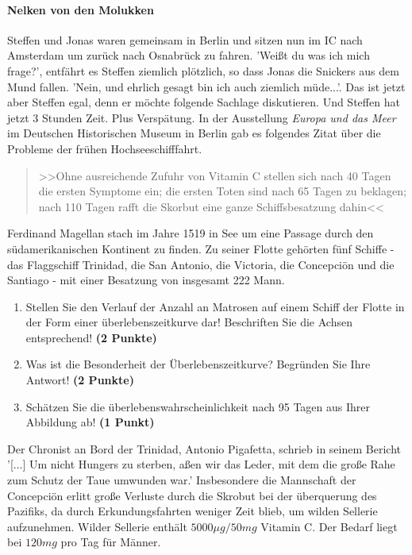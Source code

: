 \documentclass[a4paper, 9pt]{scrartcl}\usepackage[]{graphicx}\usepackage[]{xcolor}
\begin{document}
\paragraph{Nelken von den Molukken}



Steffen und Jonas waren gemeinsam in Berlin und sitzen nun im IC nach Amsterdam um zurück nach Osnabrück zu fahren. 'Weißt du was ich mich frage?', entfährt es Steffen ziemlich plötzlich, so dass Jonas die Snickers aus dem Mund fallen. 'Nein, und ehrlich gesagt bin ich auch ziemlich müde...'. Das ist jetzt aber Steffen egal, denn er möchte folgende Sachlage diskutieren. Und Steffen hat jetzt 3 Stunden Zeit. Plus Verspätung. In der Ausstellung \textit{Europa und das Meer} im Deutschen Historischen Museum in Berlin gab es folgendes Zitat über die Probleme der frühen Hochseeschifffahrt.

\begin{quote}
  >>Ohne ausreichende Zufuhr von Vitamin C stellen sich nach 40 Tagen die ersten Symptome ein; die ersten Toten sind nach 65 Tagen zu beklagen; nach 110 Tagen rafft die Skorbut eine ganze Schiffsbesatzung dahin<<
\end{quote}

Ferdinand Magellan stach im Jahre 1519 in See um eine Passage durch den südamerikanischen Kontinent zu finden. Zu seiner Flotte gehörten fünf Schiffe - das Flaggschiff Trinidad, die San Antonio, die Victoria, die Concepciön und die Santiago - mit einer Besatzung von insgesamt 222 Mann. 

\begin{enumerate}
\item Stellen Sie den Verlauf der Anzahl an Matrosen auf einem Schiff der Flotte in der Form einer überlebenszeitkurve dar! Beschriften Sie die Achsen entsprechend! \textbf{(2 Punkte)} 
\item Was ist die Besonderheit der Überlebenszeitkurve? Begründen Sie Ihre Antwort! \textbf{(2 Punkte)} 
\item Schätzen Sie die überlebenswahrscheinlichkeit nach 95 Tagen aus Ihrer Abbildung ab! \textbf{(1 Punkt)} 
\end{enumerate}

Der Chronist an Bord der Trinidad, Antonio Pigafetta, schrieb in seinem Bericht '[...] Um nicht Hungers zu sterben, aßen wir das Leder, mit dem die große Rahe zum Schutz der Taue umwunden war.' Insbesondere die Mannschaft der Concepciön erlitt große Verluste durch die Skrobut bei der überquerung des Pazifiks, da durch Erkundungsfahrten weniger Zeit blieb, um wilden Sellerie aufzunehmen. Wilder Sellerie enthält $5000\mu g/50mg$ Vitamin C. Der Bedarf liegt bei $120mg$ pro Tag für Männer.
\end{document}
